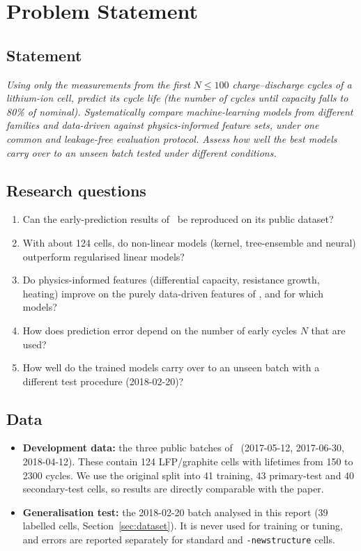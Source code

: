 \section{Problem Statement}
\label{sec:problem}

\subsection{Statement}
\textit{Using only the measurements from the first $N\le100$
charge--discharge cycles of a lithium-ion cell, predict its cycle life
(the number of cycles until capacity falls to 80\% of nominal).
Systematically compare machine-learning models from different families and
data-driven against physics-informed feature sets, under one common and
leakage-free evaluation protocol. Assess how well the best models carry
over to an unseen batch tested under different conditions.}

\subsection{Research questions}
\begin{enumerate}
  \item[\textbf{RQ1}] Can the early-prediction results of~\cite{severson2019}
  be reproduced on its public dataset?
  \item[\textbf{RQ2}] With about 124 cells, do non-linear models (kernel,
  tree-ensemble and neural) outperform regularised linear models?
  \item[\textbf{RQ3}] Do physics-informed features (differential capacity,
  resistance growth, heating) improve on the purely data-driven features of
  \cite{severson2019}, and for which models?
  \item[\textbf{RQ4}] How does prediction error depend on the number of early
  cycles $N$ that are used?
  \item[\textbf{RQ5}] How well do the trained models carry over to an unseen
  batch with a different test procedure (2018-02-20)?
\end{enumerate}

\subsection{Data}
\begin{itemize}
  \item \textbf{Development data:} the three public batches
  of~\cite{severson2019,matr_data} (2017-05-12, 2017-06-30, 2018-04-12).
  These contain 124 LFP/graphite cells with lifetimes from 150 to 2300
  cycles. We use the original split into 41 training, 43 primary-test and
  40 secondary-test cells, so results are directly comparable with the
  paper.
  \item \textbf{Generalisation test:} the 2018-02-20 batch analysed in this
  report (39 labelled cells, Section~\ref{sec:dataset}). It is never used
  for training or tuning, and errors are reported separately for standard
  and \texttt{-newstructure} cells.
\end{itemize}

